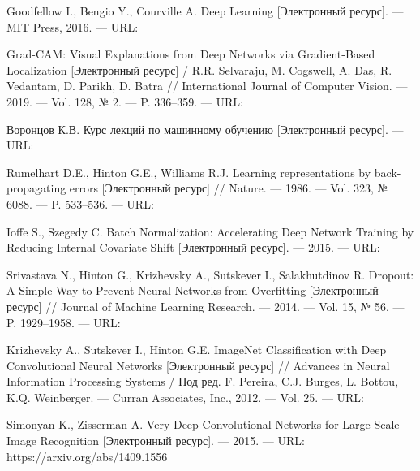 \sloppy
\begin{thebibliography}{}
     Goodfellow I., Bengio Y., Courville A.
    Deep Learning [Электронный ресурс]. — MIT Press, 2016. — URL: 

    Grad-CAM: Visual Explanations from Deep Networks via Gradient-Based Localization [Электронный ресурс] /
    R.R. Selvaraju, M. Cogswell, A. Das, R. Vedantam, D. Parikh, D. Batra //
    International Journal of Computer Vision. — 2019. — Vol. 128, № 2. — P. 336–359. — URL: 

    Воронцов К.В. Курс лекций по машинному обучению [Электронный ресурс]. — URL: 

    Rumelhart D.E., Hinton G.E., Williams R.J. Learning representations by back-propagating errors [Электронный ресурс] // Nature. — 1986. — Vol. 323, № 6088. — P. 533–536. — URL: 

    Ioffe S., Szegedy C. Batch Normalization: Accelerating Deep Network Training by Reducing Internal Covariate Shift [Электронный ресурс]. — 2015. — URL: 

    Srivastava N., Hinton G., Krizhevsky A., Sutskever I., Salakhutdinov R. Dropout: A Simple Way to Prevent Neural Networks from Overfitting [Электронный ресурс] // Journal of Machine Learning Research. — 2014. — Vol. 15, № 56. — P. 1929–1958. — URL: 

    Krizhevsky A., Sutskever I., Hinton G.E. ImageNet Classification with Deep Convolutional Neural Networks [Электронный ресурс] // Advances in Neural Information Processing Systems / Под ред. F. Pereira, C.J. Burges, L. Bottou, K.Q. Weinberger. — Curran Associates,
    Inc., 2012. — Vol. 25. — URL: 

    Simonyan K., Zisserman A. Very Deep Convolutional Networks for Large-Scale Image Recognition [Электронный ресурс]. — 2015. — URL: https://arxiv.org/abs/1409.1556
\end{thebibliography}